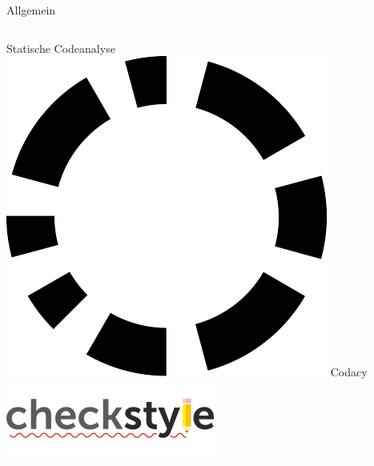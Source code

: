 \documentclass[xcolor=dvipsnames]{beamer}
\begin{document}
\begin{frame}{Allgemein}
\begin{columns}
\begin{column}{0.3\textwidth}
\begin{block}{Statische Codeanalyse}
                        \includegraphics[width=(\textwidth / 4)]{img/codacy.pdf}
                        Codacy\\
                        \includegraphics[width=(\textwidth / 2)]{img/checkstyle.png}
                    \end{block}
                \end{column}
        \end{columns}
    \end{frame}
\end{document}
